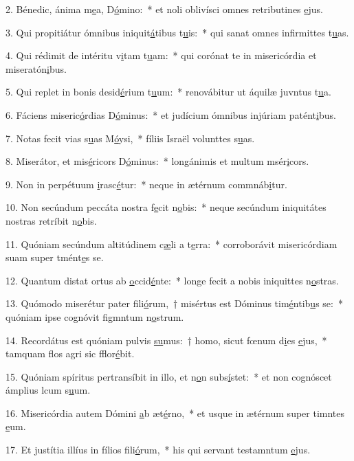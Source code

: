 2. Bénedic, ánima m\uline{e}a, D\uline{ó}mino:~* et noli oblivísci omnes retributines \uline{e}jus.\par 
3. Qui propitiátur ómnibus iniquit\uline{á}tibus t\uline{u}is:~* qui sanat omnes infirmittes t\uline{u}as.\par 
4. Qui rédimit de intéritu v\uline{i}tam t\uline{u}am:~* qui corónat te in misericórdia et miseratón\uline{i}bus.\par 
5. Qui replet in bonis desid\uline{é}rium t\uline{u}um:~* renovábitur ut áquilæ juvntus t\uline{u}a.\par 
6. Fáciens miseric\uline{ó}rdias D\uline{ó}minus:~* et judícium ómnibus injúriam patént\uline{i}bus.\par 
7. Notas fecit vias s\uline{u}as M\uline{ó}ysi,~* fíliis Israël volunttes s\uline{u}as.\par 
8. Miserátor, et mis\uline{é}ricors D\uline{ó}minus:~* longánimis et multum msér\uline{i}cors.\par 
9. Non in perpétuum \uline{i}rasc\uline{é}tur:~* neque in ætérnum commnáb\uline{i}tur.\par 
10. Non secúndum peccáta nostra f\uline{e}cit n\uline{o}bis:~* neque secúndum iniquitátes nostras retríbit n\uline{o}bis.\par 
11. Quóniam secúndum altitúdinem c\uline{æ}li a t\uline{e}rra:~* corroborávit misericórdiam suam super tmént\uline{e}s se.\par 
12. Quantum distat ortus ab \uline{o}ccid\uline{é}nte:~* longe fecit a nobis iniquittes n\uline{o}stras.\par 
13. Quómodo miserétur pater fili\uline{ó}rum,~† misértus est Dóminus tim\uline{é}ntib\uline{u}s se:~* quóniam ipse cognóvit figmntum n\uline{o}strum.\par 
14. Recordátus est quóniam pulvis \uline{su}mus:~† homo, sicut fœnum d\uline{i}es \uline{e}jus,~* tamquam flos agri sic fflor\uline{é}bit.\par 
15. Quóniam spíritus pertransíbit in illo, et n\uline{o}n subs\uline{í}stet:~* et non cognóscet ámplius lcum s\uline{u}um.\par 
16. Misericórdia autem Dómini \uline{a}b æt\uline{é}rno,~* et usque in ætérnum super timntes \uline{e}um.\par 
17. Et justítia illíus in fílios f\uline{i}li\uline{ó}rum,~* his qui servant testamntum \uline{e}jus.\par 
